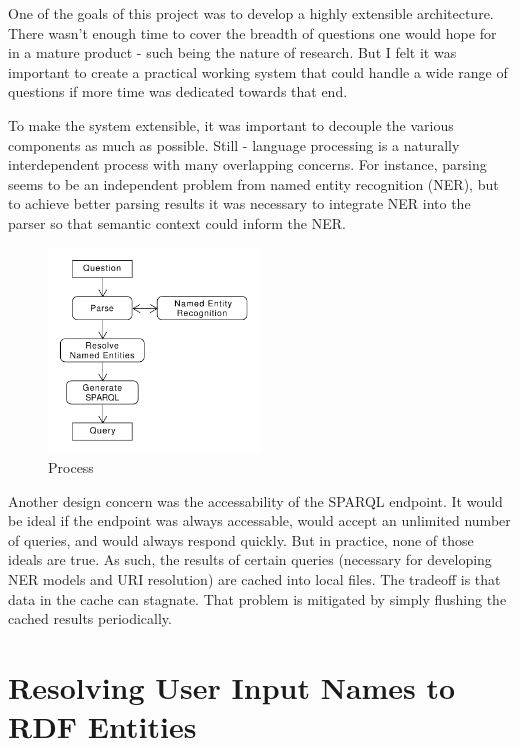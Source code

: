 \documentclass[11pt]{article}
\begin{document}
One of the goals of this project was to develop a
highly extensible architecture. There wasn't enough time to cover the
breadth of questions one would hope for in a mature product - such being
the nature of research. But I felt it was important to create a practical
working system that could handle a wide range of questions if more
time was dedicated towards that end.

To make the system extensible, it was important to decouple the various
components as much as possible. Still - language processing is a naturally
interdependent process with many overlapping concerns. For instance,
parsing seems to be an independent problem from named entity recognition (NER),
but to achieve better parsing results it was necessary to integrate NER into the
parser so that semantic context could inform the NER. 

\begin{figure}[h!]
    \centering
    \includegraphics[width=0.5\textwidth,natwidth=1,natheight=1]{umlet/usage.pdf}
    \caption{Process}
    \label{fig:process}
\end{figure}

Another design concern was the accessability of the SPARQL endpoint.
It would be ideal if the endpoint was always accessable, would accept an unlimited
number of queries, and would always respond quickly. But in practice, none of
those ideals are true. As such, the results of certain queries
(necessary for developing NER models and URI resolution) are cached into local files.
The tradeoff is that data in the cache can stagnate. That problem is mitigated by 
simply flushing the cached results periodically.


\section{Resolving User Input Names to RDF Entities}
\end{document}
